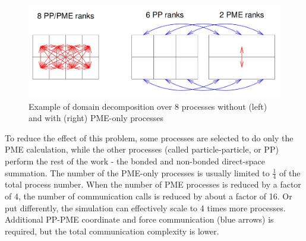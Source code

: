 \documentclass[12pt,a4paper,notitlepage]{report}
\begin{document}
 \begin{figure} [htpb]
    \centering
    \includegraphics[width=1\textwidth]{pics/DD.png}
    \caption{Example of domain decomposition over 8 processes without (left) and with (right) PME-only processes}
    \label{fig:DD}
\end{figure}
 
 \FloatBarrier

 To reduce the effect of this problem, some processes are selected to do only the PME calculation, while the other processes (called particle-particle, or PP) perform the rest of the work - the bonded and non-bonded direct-space summation. The number of the PME-only processes is usually limited to $\frac{1}{4}$ of the total process number. When the number of PME processes is reduced by a factor of 4, the number of communication calls is reduced by about a factor of 16. Or put differently, the simulation can effectively scale to 4 times more processes. Additional PP-PME coordinate and force communication (blue arrows) is required, but the total communication complexity is lower.

\end{document}
